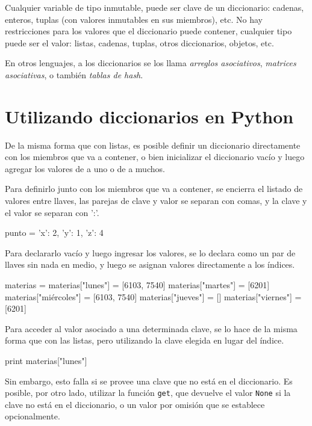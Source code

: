 Cualquier variable de tipo inmutable, puede ser clave de un diccionario:
cadenas, enteros, tuplas (con valores inmutables en sus miembros), etc.  No hay
restricciones para los valores que el diccionario puede contener, cualquier
tipo puede ser el valor: listas, cadenas, tuplas, otros diccionarios, objetos,
etc.

\begin{sabias_que}
En otros lenguajes, a los diccionarios se los llama {\it arreglos
asociativos}, {\it matrices asociativas}, o también {\it tablas de hash}.
\end{sabias_que}

\section{Utilizando diccionarios en Python}

De la misma forma que con listas, es posible definir un diccionario
directamente con los miembros que va a contener, o bien inicializar el
diccionario vacío y luego agregar los valores de a uno o de a muchos.

Para definirlo junto con los miembros que va a contener, se encierra el
listado de valores entre llaves, las parejas de clave y valor se separan
con comas, y la clave y el valor se separan con ':'.

\begin{codigo-python-sn}
punto = {'x': 2, 'y': 1, 'z': 4}
\end{codigo-python-sn}

Para declararlo vacío y luego ingresar los valores, se lo declara como un
par de llaves sin nada en medio, y luego se asignan valores directamente a
los índices.

\begin{codigo-python-sn}
materias = {}
materias["lunes"] = [6103, 7540]
materias["martes"] = [6201]
materias["miércoles"] = [6103, 7540]
materias["jueves"] = []
materias["viernes"] = [6201]
\end{codigo-python-sn}

Para acceder al valor asociado a una determinada clave, se lo hace
de la misma forma que con las listas, pero utilizando la clave
elegida en lugar del índice.

\begin{codigo-python-sn}
print materias["lunes"]
\end{codigo-python-sn}

Sin embargo, esto falla si se provee una clave que no está en el diccionario.
Es posible, por otro lado, utilizar la función \lstinline{get}, que devuelve el
valor \lstinline{None} si la clave no está en el diccionario, o un valor por
omisión que se establece opcionalmente.


